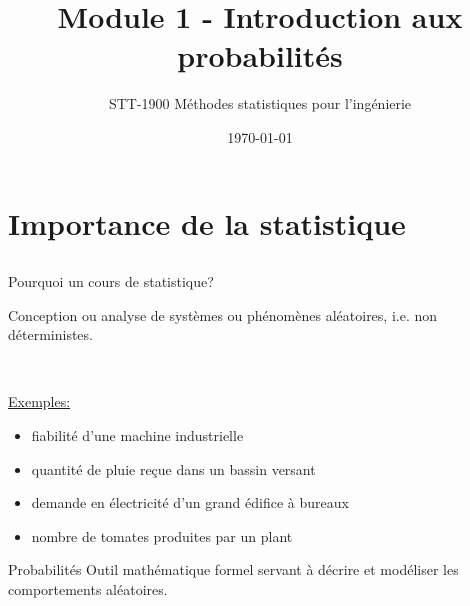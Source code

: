 \documentclass{BeamerTemplate}
\title{Module 1 - Introduction aux probabilités}
\subtitle{STT-1900 Méthodes statistiques pour l'ingénierie}
\date{\today}
\begin{document}
\begin{frame}[t]
  \titlepage
\end{frame}








\section[Statistique]{Importance de  la statistique}

\subsection*{ }

\begin{frame}[t]{Pourquoi un cours de statistique?}

Conception ou analyse de systèmes ou phénomènes  \alert{aléatoires}, i.e. non déterministes.

\bigskip
{\ }

 \underline{Exemples:}

\begin{itemize}
\item fiabilité d'une machine industrielle
\item quantité de pluie reçue dans un bassin versant
\item demande en électricité d'un grand édifice à bureaux
\item nombre de tomates produites par un plant
\end{itemize}

\end{frame}

\begin{frame}[t]%
 \begin{Boite}{Probabilités}
 Outil mathématique formel  servant à décrire et modéliser les comportements aléatoires.
 \end{Boite}

 \medskip


\end{frame}
\end{document}
